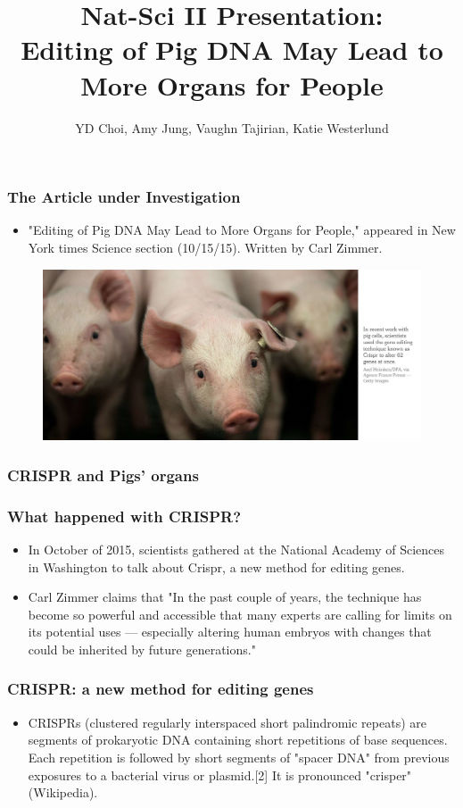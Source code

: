 \documentclass{beamer}
\title{Nat-Sci II Presentation: \\
Editing of Pig DNA May Lead to More Organs for People}
\author{YD Choi, Amy Jung, Vaughn Tajirian, Katie Westerlund }
\institute{New York University}
\begin{document}
 
\frame{\titlepage} 

\begin{frame}
\frametitle{The Article under Investigation}
\begin{itemize} 
\item "Editing of Pig DNA May Lead to More Organs for People," appeared in
New York times Science section (10/15/15). Written by Carl Zimmer.
\end{itemize}
\begin{figure}[h!]
  \centering
    \includegraphics[width=1\textwidth]{edit-pigs.png}
\end{figure}
\end{frame}

\begin{frame}
\frametitle{CRISPR and Pigs' organs}
\end{frame}

\begin{frame}
\frametitle{What happened with CRISPR?}
\begin{itemize}
\item In October of 2015, scientists gathered at the National Academy of Sciences
in Washington to talk about Crispr, a new method for editing genes.
\item Carl Zimmer claims that "In the past couple of years, 
the technique has become so powerful and accessible that many experts are 
calling for limits on its potential uses — especially altering human 
embryos with changes that could be inherited by future generations."
\end{itemize}
\end{frame}
\begin{frame}
\frametitle{CRISPR: a new method for editing genes}
\begin{itemize}
\item 
CRISPRs (clustered regularly interspaced short palindromic repeats) are 
segments of prokaryotic DNA containing short repetitions of base sequences.
Each repetition is followed by short segments of "spacer DNA" from previous
exposures to a bacterial virus or plasmid.[2] It is pronounced "crisper" 
(Wikipedia).
\end{itemize}
\end{frame}
\end{document}
